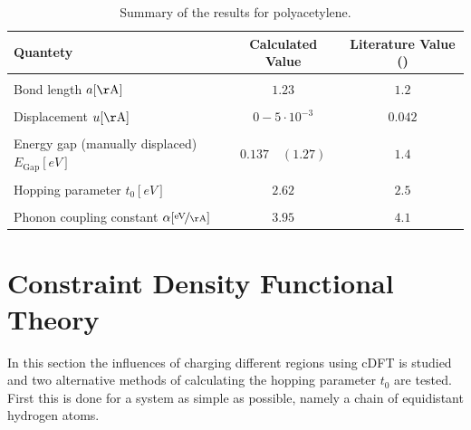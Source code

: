 \begin{table}[]
	\centering
	\begin{tabular}{l|c|c}
	Quantety & Calculated Value & Literature Value (\cite{PhysRevLett.42.1698, doi:10.1021/cr990357p})\\
	\hline \hline
	&&\\[-.3cm]
	Bond length \hfill$a [\unit{\AA}]$ & $1.23$ & $1.2$\\ \hline&&\\[-.3cm]
	Displacement \hfill$u [\unit{\AA}]$& $0 - 5\cdot10^{-3}$ & $0.042$\\ \hline&&\\[-.3cm]
	Energy gap (manually displaced)\hfill$E_\text{Gap} [\unit{eV}]$ & $0.137\quad(1.27)$ & $1.4$\\ \hline &&\\[-.3cm]
	Hopping parameter \hfill$t_0 [\unit{eV}]$ & $2.62$ & $2.5$ \\ \hline&&\\[-.3cm]
	Phonon coupling constant \hspace*{2cm}$\alpha [\unitfrac{eV}{\AA}]$& $3.95$ & $4.1$
	\end{tabular}
	\caption{Summary of the results for polyacetylene.}
	\label{table_summary_polyacetylene}
\end{table}


\section{Constraint Density Functional Theory}
\label{section_constraint_density_functonal_theory}
In this section the influences of charging different regions using cDFT is studied and two alternative methods of calculating the hopping parameter $t_0$ are tested. First this is done for a system as simple as possible, namely a chain of equidistant hydrogen atoms.
